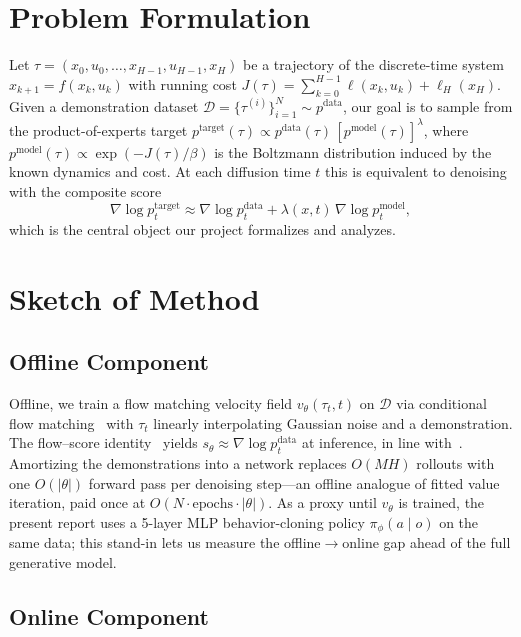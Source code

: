 \documentclass[letterpaper, 10 pt, conference]{ieeeconf}
\begin{document}
\section{Problem Formulation}

Let $\tau=(x_0,u_0,\ldots,x_{H-1},u_{H-1},x_H)$ be a trajectory of
the discrete-time system $x_{k+1}=f(x_k,u_k)$ with running cost
$J(\tau)=\sum_{k=0}^{H-1}\ell(x_k,u_k)+\ell_H(x_H)$. Given a
demonstration dataset
$\mathcal{D}=\{\tau^{(i)}\}_{i=1}^{N}\!\sim\!p^{\mathrm{data}}$,
our goal is to sample from the product-of-experts target
$p^{\mathrm{target}}(\tau)\propto p^{\mathrm{data}}(\tau)\,
[p^{\mathrm{model}}(\tau)]^{\lambda}$, where
$p^{\mathrm{model}}(\tau)\propto\exp(-J(\tau)/\beta)$ is the
Boltzmann distribution induced by the known dynamics and cost. At
each diffusion time $t$ this is equivalent to denoising with the
composite score
\begin{equation}
  \nabla\log p^{\mathrm{target}}_t \approx
  \nabla\log p^{\mathrm{data}}_t
  + \lambda(x,t)\,\nabla\log p^{\mathrm{model}}_t,
  \label{eq:score}
\end{equation}
which is the central object our project formalizes and analyzes.

\section{Sketch of Method}
\subsection{Offline Component}

Offline, we train a flow matching velocity field $v_\theta(\tau_t,t)$
on $\mathcal{D}$ via conditional flow matching~\cite{lipman2023flow}
with $\tau_t$ linearly interpolating Gaussian noise and a
demonstration. The flow--score identity~\cite{song2021score} yields
$s_\theta\!\approx\!\nabla\log p^{\mathrm{data}}_t$ at inference,
in line with~\cite{flowmp,janner2022}. Amortizing the demonstrations
into a network replaces $O(MH)$ rollouts with one
$O(|\theta|)$ forward pass per denoising step---an offline analogue
of fitted value iteration, paid once at
$O(N\!\cdot\!\text{epochs}\!\cdot\!|\theta|)$. As a proxy until
$v_\theta$ is trained, the present report uses a 5-layer MLP
behavior-cloning policy $\pi_\phi(a\mid o)$ on the same data; this
stand-in lets us measure the offline$\to$online gap ahead of the
full generative model.

\subsection{Online Component}
\end{document}
